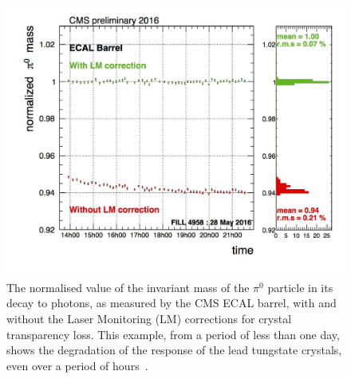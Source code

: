 \begin{figure}[h]
\centering
\includegraphics[width=1.0\textwidth]{detectorFigures/pi0_EB_plus_1.jpg}
\caption[The normalised value of the invariant mass of the $\pi^0$ particle in its decay to photons, as measured by the CMS ECAL barrel, with and without the Laser Monitoring (LM) corrections for crystal transparency loss. This example, from a period of less than one day, shows the degradation of the response of the lead tungstate crystals, even over a period of hours\quad\cite{CMSECALPublic}.]{The normalised value of the invariant mass of the $\pi^0$ particle in its decay to photons, as measured by the CMS ECAL barrel, with and without the Laser Monitoring (LM) corrections for crystal transparency loss. This example, from a period of less than one day, shows the degradation of the response of the lead tungstate crystals, even over a period of hours~\cite{CMSECALPublic}.}
\label{fig:cms:ecal:pizeroLMcorr}
\end{figure}

